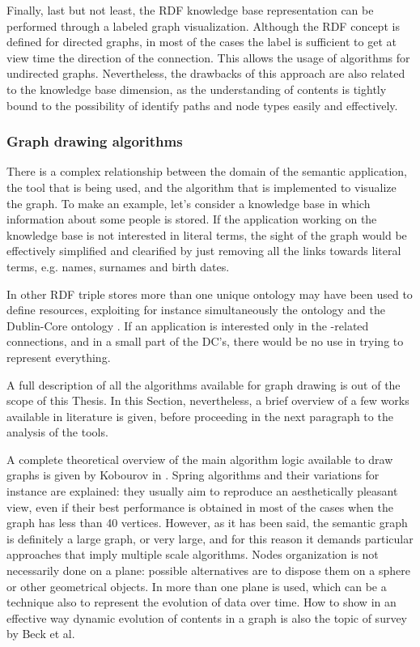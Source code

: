 Finally, last but not least, the RDF knowledge base representation can be performed through a labeled graph visualization. Although the RDF concept is defined for directed graphs, in most of the cases the label is sufficient to get at view time the direction of the connection. This allows the usage of algorithms for undirected graphs. Nevertheless, the drawbacks of this approach are also related to the knowledge base dimension, as the understanding of contents is tightly bound to the possibility of identify paths and node types easily and effectively.

\subsubsection{\textsf{Graph drawing algorithms}}

There is a complex relationship between the domain of the semantic application, the tool that is being used, and the algorithm that is implemented to visualize the graph. To make an example, let's consider a knowledge base in which information about some people is stored. If the application working on the knowledge base is not interested in literal terms, the sight of the graph would be effectively simplified and clearified by just removing all the links towards literal terms, e.g. names, surnames and birth dates. 

In other RDF triple stores more than one unique ontology may have been used to define resources, exploiting for instance simultaneously the  ontology and the Dublin-Core ontology . If an application is interested only in the -related connections, and in a small part of the DC's, there would be no use in trying to represent everything.

A full description of all the algorithms available for graph drawing is out of the scope of this Thesis. In this Section, nevertheless, a brief overview of a few works available in literature is given, before proceeding in the next paragraph to the analysis of the tools.

A complete theoretical overview of the main algorithm logic available to draw graphs is given by Kobourov in \cite{kobourov2012spring}. Spring algorithms and their variations for instance are explained: they usually aim to reproduce an aesthetically pleasant view, even if their best performance is obtained in most of the cases when the graph has less than 40 vertices. However, as it has been said, the semantic graph is definitely a large graph, or very large, and for this reason it demands particular approaches that imply multiple scale algorithms. Nodes organization is not necessarily done on a plane: possible alternatives are to dispose them on a sphere or other geometrical objects. In \cite{viola2018interactive} more than one plane is used, which can be a technique also to represent the evolution of data over time. How to show in an effective way dynamic evolution of contents in a graph is also the topic of survey \cite{beck2017taxonomy} by Beck et al.

